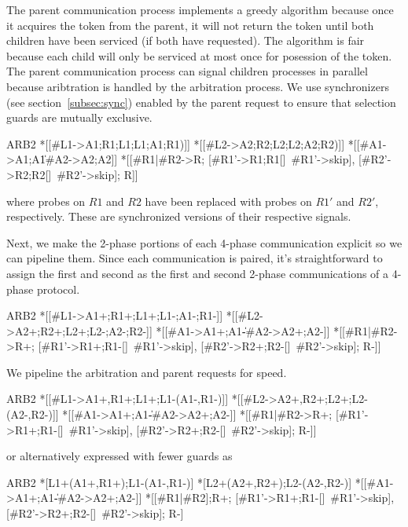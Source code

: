 \documentclass[aer.tex]{subfiles}
\begin{document}
The parent communication process implements a greedy algorithm because once it acquires the token from the parent,
it will not return the token until both children have been serviced (if both have requested). 
The algorithm is fair because each child will only be serviced at most once for posession of the token.
The parent communication process can signal children processes in parallel because aribtration is handled by the arbitration process.
We use synchronizers (see section~\ref{subsec:sync}) enabled by the parent request to ensure that selection guards are mutually exclusive.


\begin{csp}
ARB2\equiv
  *[[#{L1}->A1;R1;L1;L1;A1;R1)]] \pll
  *[[#{L2}->A2;R2;L2;L2;A2;R2)]] \pll
  *[[#{A1}->A1;A1\|#{A2}->A2;A2]]\pll
  *[[#{R1}|#{R2}->R;
    [#{R1'}->R1;R1[]~#{R1'}->skip],
    [#{R2'}->R2;R2[]~#{R2'}->skip];
    R]]
\end{csp}
where probes on $R1$ and $R2$ have been replaced with probes on $R1'$ and $R2'$, respectively. 
These are synchronized versions of their respective signals.

Next, we make the 2-phase portions of each 4-phase communication explicit so we can pipeline them.
Since each communication is paired, it's straightforward to assign the first and second as the first and second
2-phase communications of a 4-phase protocol. 

\begin{csp}
ARB2\equiv
  *[[#{L1}->A1+;R1+;L1+;L1-;A1-;R1-]] \pll
  *[[#{L2}->A2+;R2+;L2+;L2-;A2-;R2-]] \pll
  *[[#{A1}->A1+;A1-\|#{A2}->A2+;A2-]]\pll
  *[[#{R1}|#{R2}->R+;
    [#{R1'}->R1+;R1-[]~#{R1'}->skip],
    [#{R2'}->R2+;R2-[]~#{R2'}->skip];
    R-]]
\end{csp}

We pipeline the arbitration and parent requests for speed.

\begin{csp}
ARB2\equiv
  *[[#{L1}->A1+,R1+;L1+;L1-\star(A1-,R1-)]] \pll
  *[[#{L2}->A2+,R2+;L2+;L2-\star(A2-,R2-)]] \pll
  *[[#{A1}->A1+;A1-\|#{A2}->A2+;A2-]]\pll
  *[[#{R1}|#{R2}->R+;
    [#{R1'}->R1+;R1-[]~#{R1'}->skip],
    [#{R2'}->R2+;R2-[]~#{R2'}->skip];
    R-]]
\end{csp}

or alternatively expressed with fewer guards as

\begin{csp}
ARB2\equiv
  *[L1+\star(A1+,R1+);L1-\star(A1-,R1-)] \pll
  *[L2+\star(A2+,R2+);L2-\star(A2-,R2-)] \pll
  *[[#{A1}->A1+;A1-\|#{A2}->A2+;A2-]]\pll
  *[[#{R1}|#{R2}];R+;
    [#{R1'}->R1+;R1-[]~#{R1'}->skip],
    [#{R2'}->R2+;R2-[]~#{R2'}->skip];
    R-]
\end{csp}
\end{document}
